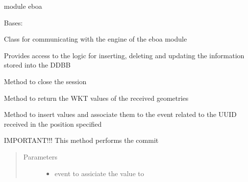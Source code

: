 module eboa

\begin{fulllineitems}
\label{\detokenize{eboa.engine:eboa.engine.engine.Engine}}
Bases: 

Class for communicating with the engine of the eboa module

Provides access to the logic for inserting, deleting and updating
the information stored into the DDBB

\begin{fulllineitems}
\label{\detokenize{eboa.engine:eboa.engine.engine.Engine.close_session}}
Method to close the session

\end{fulllineitems}


\begin{fulllineitems}
\label{\detokenize{eboa.engine:eboa.engine.engine.Engine.geometries_to_wkt}}
Method to return the WKT values of the received geometries

\end{fulllineitems}


\begin{fulllineitems}
\label{\detokenize{eboa.engine:eboa.engine.engine.Engine.insert_event_values}}
Method to insert values and associate them to the event related to the UUID received in the position specified

IMPORTANT!!! This method performs the commit
\begin{quote}\begin{description}
\item[{Parameters}] \leavevmode\begin{itemize}
\item {} 
 \textendash{} event to assiciate the value to


\end{itemize}
\end{description}
\end{quote}
\end{fulllineitems}
\end{fulllineitems}
